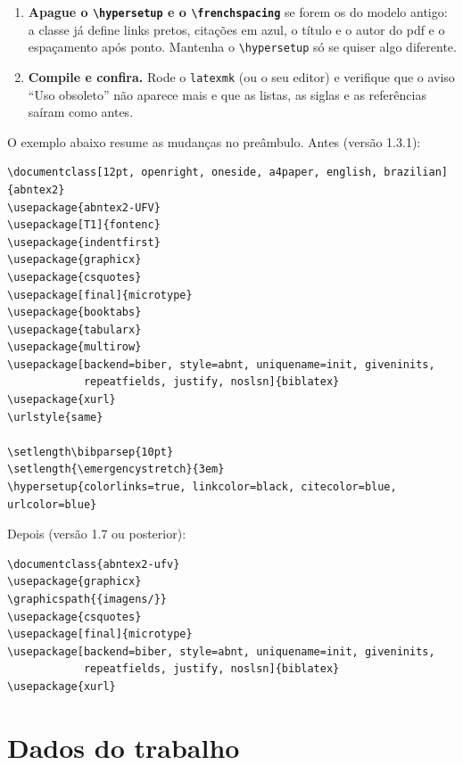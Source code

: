 \begin{enumerate}
        \texttt{\textbackslash includegraphics\{figura\}} basta, sem o nome da pasta. Os
        caminhos antigos, como \texttt{imagens/figura} ou arquivos na pasta principal,
        continuam funcionando.
  \item \textbf{Apague o \texttt{\textbackslash hypersetup} e o \texttt{\textbackslash frenchspacing}}
        se forem os do modelo antigo: a classe já define links pretos, citações em azul,
        o título e o autor do \ac{pdf} e o espaçamento após ponto. Mantenha o
        \texttt{\textbackslash hypersetup} só se quiser algo diferente.
  \item \textbf{Compile e confira.} Rode o \texttt{latexmk} (ou o seu editor) e verifique
        que o aviso ``Uso obsoleto'' não aparece mais e que as listas, as siglas e as
        referências saíram como antes.
\end{enumerate}

O exemplo abaixo resume as mudanças no preâmbulo. Antes (versão 1.3.1):

\begin{lstlisting}[style=exemplo, language={[LaTeX]TeX}]
\documentclass[12pt, openright, oneside, a4paper, english, brazilian]{abntex2}
\usepackage{abntex2-UFV}
\usepackage[T1]{fontenc}
\usepackage{indentfirst}
\usepackage{graphicx}
\usepackage{csquotes}
\usepackage[final]{microtype}
\usepackage{booktabs}
\usepackage{tabularx}
\usepackage{multirow}
\usepackage[backend=biber, style=abnt, uniquename=init, giveninits,
            repeatfields, justify, noslsn]{biblatex}
\usepackage{xurl}
\urlstyle{same}

\setlength\bibparsep{10pt}
\setlength{\emergencystretch}{3em}
\hypersetup{colorlinks=true, linkcolor=black, citecolor=blue, urlcolor=blue}
\end{lstlisting}
Depois (versão 1.7 ou posterior):

\begin{lstlisting}[style=exemplo, language={[LaTeX]TeX}]
\documentclass{abntex2-ufv}
\usepackage{graphicx}
\graphicspath{{imagens/}}
\usepackage{csquotes}
\usepackage[final]{microtype}
\usepackage[backend=biber, style=abnt, uniquename=init, giveninits,
            repeatfields, justify, noslsn]{biblatex}
\usepackage{xurl}

\end{lstlisting}

\section{Dados do trabalho}

